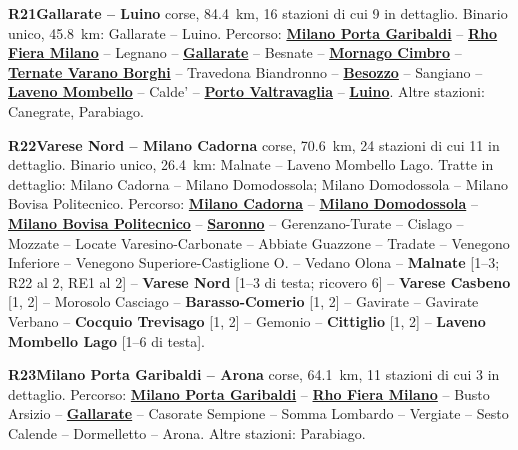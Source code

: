 \medskip\noindent\hypertarget{lin:R21}{\textbf{R21\enspace Gallarate -- Luino}} corse, \SI{84,4}{\km}, 16 stazioni di cui 9 in dettaglio. Binario unico, \SI{45,8}{\km}: Gallarate -- Luino. Percorso: \hyperlink{sta:S01645}{\textbf{Milano Porta Garibaldi}} -- \hyperlink{sta:S01039}{\textbf{Rho Fiera Milano}} -- Legnano -- \hyperlink{sta:S01030}{\textbf{Gallarate}} -- Besnate -- \hyperlink{sta:S01144}{\textbf{Mornago Cimbro}} -- \hyperlink{sta:S01143}{\textbf{Ternate Varano Borghi}} -- Travedona Biandronno -- \hyperlink{sta:S01141}{\textbf{Besozzo}} -- Sangiano -- \hyperlink{sta:S01118}{\textbf{Laveno Mombello}} -- Calde' -- \hyperlink{sta:S01116}{\textbf{Porto Valtravaglia}} -- \hyperlink{sta:S01113}{\textbf{Luino}}. Altre stazioni: Canegrate, Parabiago.

\medskip\noindent\hypertarget{lin:R22}{\textbf{R22\enspace Varese Nord -- Milano Cadorna}} corse, \SI{70,6}{\km}, 24 stazioni di cui 11 in dettaglio. Binario unico, \SI{26,4}{\km}: Malnate -- Laveno Mombello Lago. Tratte in dettaglio: Milano Cadorna -- Milano Domodossola; Milano Domodossola -- Milano Bovisa Politecnico. Percorso: \hyperlink{sta:S01066}{\textbf{Milano Cadorna}} -- \hyperlink{sta:S01067}{\textbf{Milano Domodossola}} -- \hyperlink{sta:S01642}{\textbf{Milano Bovisa Politecnico}} -- \hyperlink{sta:S01933}{\textbf{Saronno}} -- Gerenzano-Turate -- Cislago -- Mozzate -- Locate Varesino-Carbonate -- Abbiate Guazzone -- Tradate -- Venegono Inferiore -- Venegono Superiore-Castiglione O. -- Vedano Olona -- \hypertarget{sta:S01737}{\textbf{Malnate}} [1--3; R22 al 2, RE1 al 2] -- \hypertarget{sta:S01738}{\textbf{Varese Nord}} [1--3 di testa; ricovero 6] -- \hypertarget{sta:S01739}{\textbf{Varese Casbeno}} [1, 2] -- Morosolo Casciago -- \hypertarget{sta:S01741}{\textbf{Barasso-Comerio}} [1, 2] -- Gavirate -- Gavirate Verbano -- \hypertarget{sta:S01744}{\textbf{Cocquio Trevisago}} [1, 2] -- Gemonio -- \hypertarget{sta:S01746}{\textbf{Cittiglio}} [1, 2] -- \hypertarget{sta:S01747}{\textbf{Laveno Mombello Lago}} [1--6 di testa].

\medskip\noindent\hypertarget{lin:R23}{\textbf{R23\enspace Milano Porta Garibaldi -- Arona}} corse, \SI{64,1}{\km}, 11 stazioni di cui 3 in dettaglio. Percorso: \hyperlink{sta:S01645}{\textbf{Milano Porta Garibaldi}} -- \hyperlink{sta:S01039}{\textbf{Rho Fiera Milano}} -- Busto Arsizio -- \hyperlink{sta:S01030}{\textbf{Gallarate}} -- Casorate Sempione -- Somma Lombardo -- Vergiate -- Sesto Calende -- Dormelletto -- Arona. Altre stazioni: Parabiago.

